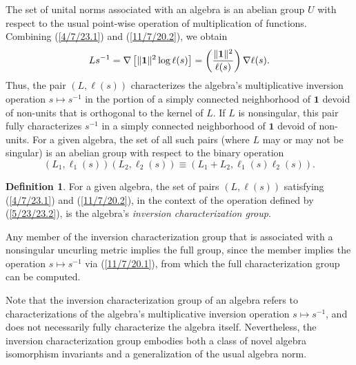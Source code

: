 \documentclass{amsart}
\numberwithin{equation}{section}
\theoremstyle{definition}
\newtheorem{definition}[theorem]{Definition}
\numberwithin{theorem}{section}
\begin{document}
   \bigskip
   
  The set of unital norms associated with an algebra is an abelian group $ U$ with respect to the usual point-wise operation of multiplication of functions.  Combining (\ref{4/7/23.1}) and (\ref{11/7/20.2}), we obtain  \begin{equation}\label{11/7/20.1} Ls^{-1}  = \nabla\left[\|{\bf 1}\|^2\log  \ell(s)\right] =   \left(\frac{\|{\bf 1}\|^2}{ \ell(s)}\right)\nabla \ell(s).\end{equation} 
Thus, the pair $(L, \ell(s))$ characterizes the algebra's multiplicative inversion operation $s\mapsto s^{-1}$ in the portion of a simply connected neighborhood of $\mathbf{1}$ devoid of non-units that is orthogonal to the kernel of $L$.  If $L$ is nonsingular, this pair fully characterizes $s^{-1}$ in a simply connected neighborhood of $\mathbf{1}$ devoid of non-units.  For a given algebra, the set of all such pairs (where $L$ may or may not be singular) is an abelian group with respect to the binary operation 
\begin{equation}\label{5/23/23.2} (L_1, \ell_1(s))(L_2, \ell_2(s)) \equiv 
\left(L_1+L_2, \ell_1(s)  \ell_2(s)\right).\end{equation} 
\begin{definition} For a given algebra, the set of pairs $(L, \ell(s))$ satisfying (\ref{4/7/23.1}) and (\ref{11/7/20.2}), in the context of the operation defined by (\ref{5/23/23.2}), is the algebra's {\it inversion characterization group}. \end{definition}

Any member of the inversion characterization group that is associated with a nonsingular uncurling metric implies the full group, since the member implies the operation $s\mapsto s^{-1}$ via (\ref{11/7/20.1}), from which the full characterization group can be computed.

Note that the inversion characterization group of an algebra refers to characterizations of the algebra's multiplicative inversion operation $s\mapsto s^{-1}$, and does not necessarily fully characterize the algebra itself.  
Nevertheless,  the inversion characterization group embodies both a class of  novel algebra isomorphism invariants and a generalization of the usual algebra norm.  
\end{document}
